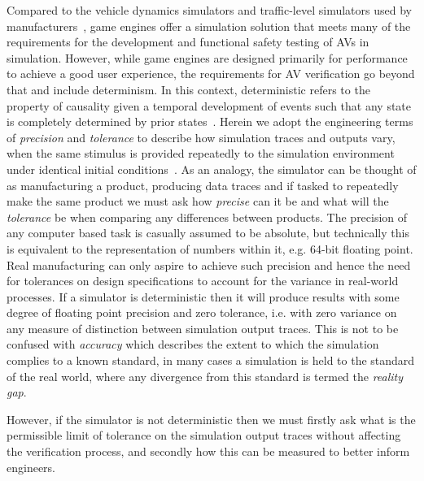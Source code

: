 \documentclass[letterpaper, 10 pt, journal, twoside]{IEEEtran}
\begin{document}
Compared to the vehicle dynamics simulators and traffic-level simulators used by manufacturers~\cite{FrameworkAndChallenges}, game engines offer a simulation solution that meets many of the requirements for the development and functional safety testing of AVs in simulation. 
%
However, while game engines are designed primarily for performance to achieve a good user experience, the requirements for AV verification go beyond that and include determinism.
%
In this context, deterministic refers to the property of causality given a temporal development of events such that any state is completely determined by prior states~\cite{Schumann2010}.
% 
%
Herein we adopt the engineering terms of \textit{precision} and \textit{tolerance} to describe how simulation traces and outputs vary, when the same stimulus is provided repeatedly to the simulation environment under identical initial conditions~\cite{ADictionaryofMechanicalEngineering}. %
%
As an analogy, the simulator can be thought of as manufacturing a product, producing data traces and if tasked to repeatedly make the same product we must ask how \textit{precise} can it be and what will the \textit{tolerance} be when comparing any differences between products. The precision of any computer based task is casually assumed to be absolute, but technically this is equivalent to the representation of numbers within it, e.g. 64-bit floating point. %
%
Real manufacturing can only aspire to achieve such precision and hence the need for tolerances on design specifications to account for the variance in real-world processes. If a simulator is deterministic then it will produce results with some degree of floating point precision and zero tolerance, i.e. with zero variance on any measure of distinction between simulation output traces. 
%
This is not to be confused with \textit{accuracy} which describes the extent to which the simulation complies to a known standard, in many cases a simulation is held to the standard of the real world, where any divergence from this standard is termed the \textit{reality gap}.  

However, if the simulator is not deterministic then we must firstly ask what is the permissible limit of tolerance on the simulation output traces without affecting the verification process, and secondly how this can be measured to better inform engineers. 
\end{document}
